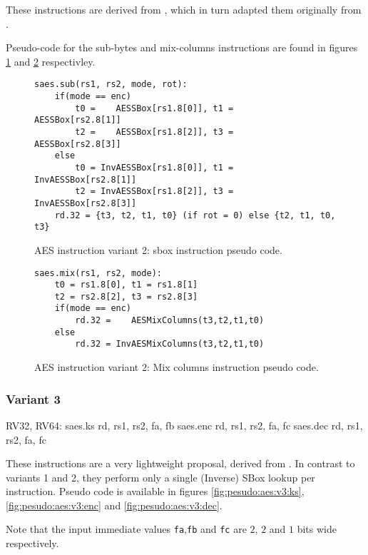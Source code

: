 These instructions are derived from \cite{MPP:19}, which in turn adapted
them originally from \cite{TG:06}.

Pseudo-code for the sub-bytes and mix-columns instructions are found in
figures
\ref{fig:pesudo:aes:v2:sub}
and
\ref{fig:pesudo:aes:v2:mix}
respectivley.

\begin{figure}
\begin{lstlisting}
saes.sub(rs1, rs2, mode, rot):
    if(mode == enc)
        t0 =    AESSBox[rs1.8[0]], t1 =    AESSBox[rs2.8[1]]
        t2 =    AESSBox[rs1.8[2]], t3 =    AESSBox[rs2.8[3]]
    else
        t0 = InvAESSBox[rs1.8[0]], t1 = InvAESSBox[rs2.8[1]]
        t2 = InvAESSBox[rs1.8[2]], t3 = InvAESSBox[rs2.8[3]]
    rd.32 = {t3, t2, t1, t0} (if rot = 0) else {t2, t1, t0, t3}
\end{lstlisting}
\caption{AES instruction variant 2: sbox instruction pseudo code.}
\label{fig:pesudo:aes:v2:sub}
\end{figure}

\begin{figure}
\begin{lstlisting}
saes.mix(rs1, rs2, mode):
    t0 = rs1.8[0], t1 = rs1.8[1]
    t2 = rs2.8[2], t3 = rs2.8[3]
    if(mode == enc)
        rd.32 =    AESMixColumns(t3,t2,t1,t0)
    else
        rd.32 = InvAESMixColumns(t3,t2,t1,t0)
\end{lstlisting}
\caption{AES instruction variant 2: Mix columns instruction pseudo code.}
\label{fig:pesudo:aes:v2:mix}
\end{figure}

\subsubsection{Variant 3}

\begin{cryptoisa}
RV32, RV64:
    saes.ks     rd, rs1, rs2, fa, fb    
    saes.enc    rd, rs1, rs2, fa, fc
    saes.dec    rd, rs1, rs2, fa, fc
\end{cryptoisa}

These instructions are a very lightweight proposal, derived from
\cite{MJS:20}.
In contrast to variants 1 and 2, they perform only a single (Inverse) SBox
lookup per instruction.
Pseudo code is available in figures
\ref{fig:pesudo:aes:v3:ks},
\ref{fig:pesudo:aes:v3:enc} and
\ref{fig:pesudo:aes:v3:dec}.

Note that the input immediate values {\tt fa},{\tt fb} and {\tt fc}
are $2$, $2$ and $1$ bits wide respectively.

